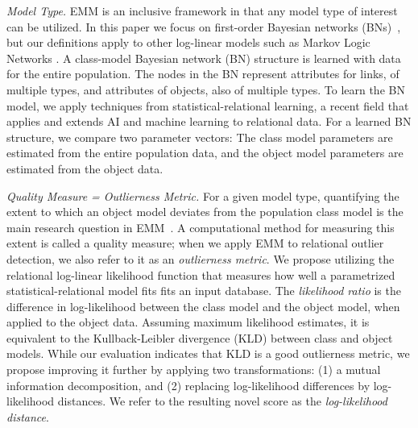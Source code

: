 {{\em Model Type.} EMM is an inclusive framework in that any model type of interest can be utilized. In this paper we focus on first-order Bayesian networks (BNs)~\citep{Wang2008,Poole2003,Kimmig2014}, but our definitions apply to other log-linear models such as Markov Logic Networks \citep{Domingos2007}. 
A class-model Bayesian network (BN) structure is learned with data for the entire population. The nodes in the BN represent attributes for links, of multiple types, and attributes of objects, also of multiple types. To learn the BN model, we apply techniques from statistical-relational learning, a  recent field that applies and extends AI and machine learning to relational data\citep{SRL2007,Schulte2012,Domingos2009}. For a learned BN structure, we compare two parameter vectors: The class model parameters are estimated from the entire population data, and the object model parameters are estimated from the object data. 

{\em Quality Measure = Outlierness Metric.} For a given model type, quantifying the extent to which an object model deviates from the population class model is the main research question in EMM~\citep{Duivesteijn2016}. A computational method for measuring this extent is called a quality measure; when we apply EMM to relational outlier detection, we also refer to it as an {\em outlierness metric}. We propose utilizing the relational log-linear likelihood function \citep{Kimmig2014,Schulte2011} that measures how well a parametrized statistical-relational model fits fits an input database. The {\em likelihood ratio} is the difference in log-likelihood between the class model and the object model, when applied to the object data. Assuming maximum likelihood estimates, it is equivalent to the Kullback-Leibler divergence (KLD) between class and object models. While our evaluation indicates that KLD is a good outlierness metric, we propose improving it further by applying two transformations: (1) a mutual information decomposition, and (2) replacing log-likelihood differences by log-likelihood distances. We refer to the resulting novel score as the {\em log-likelihood distance}. 


}
